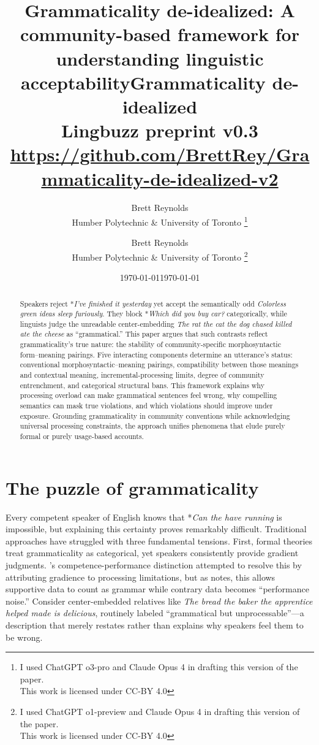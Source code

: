 \documentclass[12pt]{article}
\title{Grammaticality de-idealized: A community-based framework for understanding linguistic acceptability}
\author{Brett Reynolds \orcidlink{0000-0003-0073-7195}\\Humber Polytechnic \& University of Toronto
\thanks{I used ChatGPT o3-pro and Claude Opus 4 in drafting this version of the paper.\\This work is licensed under CC-BY 4.0}}
\date{\today}
\title{Grammaticality de-idealized\\[4pt]
       \large Lingbuzz preprint v0.3\\[6pt]
       \normalsize \url{https://github.com/BrettRey/Grammaticality-de-idealized-v2}}
\author{Brett Reynolds \orcidlink{0000-0003-0073-7195}\\Humber Polytechnic \& University of Toronto
\thanks{I used ChatGPT o1-preview and Claude Opus 4 in drafting this version of the paper.\\This work is licensed under CC-BY 4.0}}
\date{\today}
\begin{document}
\maketitle

\begin{abstract}
Speakers reject *\textit{I've finished it yesterday} yet accept the semantically odd \textit{Colorless green ideas sleep furiously}. They block *\textit{Which did you buy car?} categorically, while linguists judge the unreadable center-embedding \textit{The rat the cat the dog chased killed ate the cheese} as ``grammatical.'' This paper argues that such contrasts reflect grammaticality's true nature: the stability of community-specific morphosyntactic form–meaning pairings. Five interacting components determine an utterance's status: conventional morphosyntactic–meaning pairings, compatibility between those meanings and contextual meaning, incremental-processing limits, degree of community entrenchment, and categorical structural bans. This framework explains why processing overload can make grammatical sentences feel wrong, why compelling semantics can mask true violations, and which violations should improve under exposure. Grounding grammaticality in community conventions while acknowledging universal processing constraints, the approach unifies phenomena that elude purely formal or purely usage-based accounts.
\end{abstract}

\section{The puzzle of grammaticality}

Every competent speaker of English knows that *\textit{Can the have running} is impossible, but explaining this certainty proves remarkably difficult. Traditional approaches have struggled with three fundamental tensions. First, formal theories treat grammaticality as categorical, yet speakers consistently provide gradient judgments. \textcite{chomsky1965}'s competence-performance distinction attempted to resolve this by attributing gradience to processing limitations, but as \textcite[71]{schutze2016} notes, this allows supportive data to count as grammar while contrary data becomes ``performance noise.'' Consider center-embedded relatives like \textit{The bread the baker the apprentice helped made is delicious}, routinely labeled ``grammatical but unprocessable''—a description that merely restates rather than explains why speakers feel them to be wrong.
\end{document}
